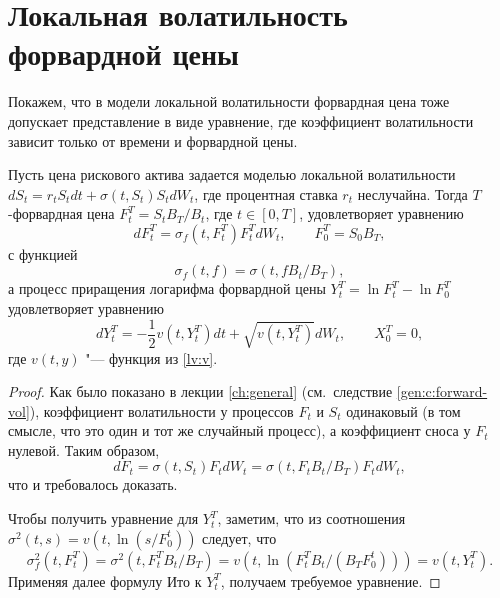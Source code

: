 \section{Локальная волатильность форвардной цены}
Покажем, что в модели локальной волатильности форвардная цена тоже допускает представление в виде уравнение, где коэффициент волатильности зависит только от времени и форвардной цены. 

\begin{proposition}
Пусть цена рискового актива задается моделью локальной волатильности $dS_t = r_tS_t dt + \sigma(t,S_t) S_t d W_t$, где процентная ставка $r_t$ неслучайна. Тогда $T$-форвардная цена $F_t^T = S_tB_T/B_t$, где $t\in[0,T]$, удовлетворяет уравнению
\[
d F_t^T = \sigma_f(t,F_t^T) F_t^T d W_t, \qquad F_0^T = S_0B_T,
\]
с функцией
\[
\sigma_f(t,f) = \sigma(t,f B_t/B_T),
\]
а процесс приращения логарифма форвардной цены $Y_t^T = \ln F_t^T - \ln F_0^T$ удовлетворяет уравнению
\[
d Y_t^T = -\frac12 v(t, Y_t^T) dt + \sqrt{v(t, Y_t^T)} d W_t, \qquad X_0^T=0,
\]
где $v(t,y)$ "--- функция из \eqref{lv:v}.
\end{proposition}

\begin{proof}
Как было показано в лекции \ref{ch:general} (см.~следствие \ref{gen:c:forward-vol}), коэффициент волатильности у процессов $F_t$ и $S_t$ одинаковый (в том смысле, что это один и тот же случайный процесс), а коэффициент сноса у $F_t$ нулевой. Таким образом,
\[
d F_t = \sigma(t,S_t)F_t d W_t = \sigma(t, F_tB_t/B_T) F_tdW_t,
\]
что и требовалось доказать.

Чтобы получить уравнение для $Y_t^T$, заметим, что из соотношения $\sigma^2(t,s) = v(t, \ln(s/F_0^t))$ следует, что
\[
\sigma^2_f(t,F_t^T) = \sigma^2(t,F_t^TB_t/B_T) = v(t, \ln(F_t^TB_t/(B_TF_0^t))) = v(t,Y_t^T).
\]
Применяя далее формулу Ито к $Y_t^T$, получаем требуемое уравнение.
\end{proof}





